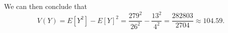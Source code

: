 \documentclass[9pt]{article}
\begin{document}
\begin{enumerate}
\begin{enumerate}
               We can then conclude that
               $$V(Y) = E[Y^2] - E[Y]^2 = \frac{279^2}{26^2} - \frac{13^2}{4^2}
                 = \frac{282803}{2704} \approx 104.59.$$
      \end{enumerate}
\end{enumerate}
\end{document}

